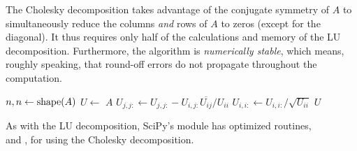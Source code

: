 The Cholesky decomposition takes advantage of the conjugate symmetry of $A$ to simultaneously reduce the columns \emph{and} rows of $A$ to zeros (except for the diagonal).
It thus requires only half of the calculations and memory of the LU decomposition.
Furthermore, the algorithm is \emph{numerically stable}, which means, roughly speaking, that round-off errors do not propagate throughout the computation.

\begin{algorithm}[H]
\begin{algorithmic}[1]
\State $n,n \gets \mathrm{shape}(A)$
\State $U \gets$ $A$\li{)}
        \State $U_{j,j:} \gets U_{j,j:} - U_{i,j:}\overline{U_{ij}}/U_{ii}$
    \EndFor
    \State $U_{i,i:} \gets U_{i,i:}/\sqrt{U_{ii}}$
\EndFor
\State {} $U$
\EndProcedure
\end{algorithmic}
\caption{}
\end{algorithm}
%
As with the LU decomposition, SciPy's  module has optimized routines,\\ and , for using the Cholesky decomposition.

